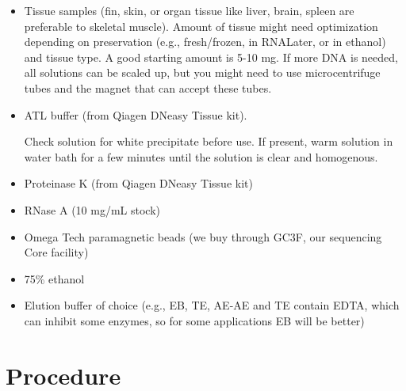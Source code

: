\documentclass[
  letterpaper,
  DIV=11,
  numbers=noendperiod]{scrreprt}
\begin{document}
\begin{itemize}
\item
  Tissue samples (fin, skin, or organ tissue like liver, brain, spleen
  are preferable to skeletal muscle). Amount of tissue might need
  optimization depending on preservation (e.g., fresh/frozen, in
  RNALater, or in ethanol) and tissue type. A good starting amount is
  5-10 mg. If more DNA is needed, all solutions can be scaled up, but
  you might need to use microcentrifuge tubes and the magnet that can
  accept these tubes.
\item
  ATL buffer (from Qiagen DNeasy Tissue kit).

  \begin{tcolorbox}[enhanced jigsaw, toprule=.15mm, breakable, coltitle=black, leftrule=.75mm, title=\textcolor{quarto-callout-warning-color}{\faExclamationTriangle}\hspace{0.5em}{IMPORTANT}, bottomrule=.15mm, toptitle=1mm, bottomtitle=1mm, colframe=quarto-callout-warning-color-frame, opacityback=0, colback=white, opacitybacktitle=0.6, colbacktitle=quarto-callout-warning-color!10!white, rightrule=.15mm, titlerule=0mm, arc=.35mm, left=2mm]

  Check solution for white precipitate before use. If present, warm
  solution in water bath for a few minutes until the solution is clear
  and homogenous.

  \end{tcolorbox}
\item
  Proteinase K (from Qiagen DNeasy Tissue kit)
\item
  RNase A (10 mg/mL stock)
\item
  Omega Tech paramagnetic beads (we buy through GC3F, our sequencing
  Core facility)
\item
  75\% ethanol
\item
  Elution buffer of choice (e.g., EB, TE, AE-AE and TE contain EDTA,
  which can inhibit some enzymes, so for some applications EB will be
  better)
\end{itemize}

\hypertarget{procedure-20}{%
\section{Procedure}\label{procedure-20}}
\end{document}
